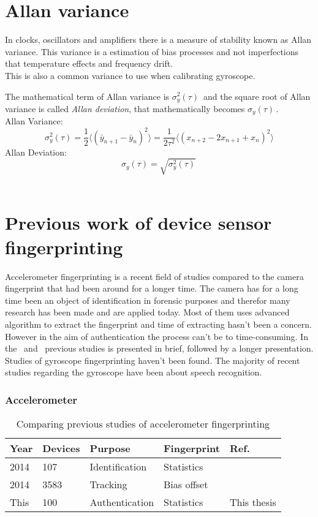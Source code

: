 \section{Allan variance}\label{char:allan}
In clocks, oscillators and amplifiers there is a measure of stability known as Allan variance. This variance is a estimation of bias processes and not imperfections that temperature effects and frequency drift.~\cite[]{allan}\\ 
This is also a common variance to use when calibrating gyroscope.~\cite[]{allanGyro1}~\cite[]{allanGyro2}

The mathematical term of Allan variance is $\sigma_y^2(\tau)\, $ and the square root of Allan variance is called \textit{Allan deviation}, that mathematically becomes $\sigma_y(\tau)\,$. \\
Allan Variance: \\
$$\sigma_y^2(\tau) = \frac{1}{2}\langle(\bar{y}_{n+1}-\bar{y}_n)^2\rangle = \frac{1}{2\tau^2}\langle(x_{n+2}-2x_{n+1}+x_n)^2\rangle$$
Allan Deviation:
$$\sigma_y(\tau) = \sqrt{\sigma_y^2(\tau)} \, $$
~\cite[]{allan}


\section{Previous work of device sensor fingerprinting}
Accelerometer fingerprinting is a recent field of studies compared to the camera fingerprint that had been around for a longer time. The camera has for a long time been an object of identification in forensic purposes and therefor many research has been made and are applied today. Most of them uses advanced algorithm to extract the fingerprint and time of extracting hasn't been a concern. However in the aim of authentication the process can't be to time-consuming. In the~ and~ previous studies is presented in brief, followed by a longer presentation. Studies of gyroscope fingerprinting haven't been found. The majority of recent studies regarding the gyroscope have been about speech recognition.  \cite[]{sensor:speechGyro} 



\begin{table}[H]
\subsubsection*{Accelerometer}
\centering
\begin{tabular}{| p{1cm} | p{1cm} | p{2.5cm} | p{1.8cm} | p{3.5cm} |}
  Year & Devices & Purpose & Fingerprint & Ref. \\ \hline
  2014 & 107 & Identification & Statistics &~\cite[]{sensor:accelPrint} \\
  2014 & 3583 & Tracking & Bias offset &~\cite[]{sensor:micSpeak} \\
  This & 100 & Authentication & Statistics & This thesis \\ \hline
\end{tabular} 
\caption{Comparing previous studies of accelerometer fingerprinting} \label{table:prevAcc}
\end{table}

